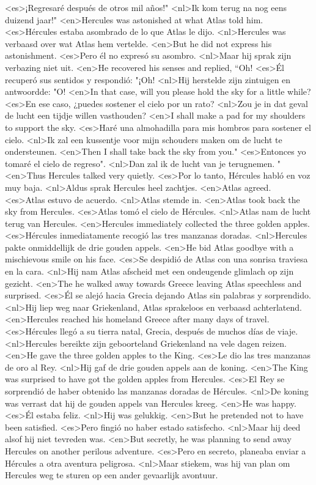 <es>¡Regresaré después de otros mil años!"
<nl>Ik kom terug na nog eens duizend jaar!"
<en>Hercules was astonished at what Atlas told him.
<es>Hércules estaba asombrado de lo que Atlas le dijo.
<nl>Hercules was verbaasd over wat Atlas hem vertelde.
<en>But he did not express his astonishment.
<es>Pero él no expresó su asombro.
<nl>Maar hij sprak zijn verbazing niet uit.
<en>He recovered his senses and replied, “Oh!
<es>Él recuperó sus sentidos y respondió: "¡Oh!
<nl>Hij herstelde zijn zintuigen en antwoordde: "O!
<en>In that case, will you please hold the sky for a little while?
<es>En ese caso, ¿puedes sostener el cielo por un rato?
<nl>Zou je in dat geval de lucht een tijdje willen vasthouden?
<en>I shall make a pad for my shoulders to support the sky.
<es>Haré una almohadilla para mis hombros para sostener el cielo.
<nl>Ik zal een kussentje voor mijn schouders maken om de lucht te ondersteunen.
<en>Then I shall take back the sky from you."
<es>Entonces yo tomaré el cielo de regreso".
<nl>Dan zal ik de lucht van je terugnemen. "
<en>Thus Hercules talked very quietly.
<es>Por lo tanto, Hércules habló en voz muy baja.
<nl>Aldus sprak Hercules heel zachtjes.
<en>Atlas agreed.
<es>Atlas estuvo de acuerdo.
<nl>Atlas stemde in.
<en>Atlas took back the sky from Hercules.
<es>Atlas tomó el cielo de Hércules.
<nl>Atlas nam de lucht terug van Hercules.
<en>Hercules immediately collected the three golden apples.
<es>Hércules inmediatamente recogió las tres manzanas doradas.
<nl>Hercules pakte onmiddellijk de drie gouden appels.
<en>He bid Atlas goodbye with a mischievous smile on his face.
<es>Se despidió de Atlas con una sonrisa traviesa en la cara.
<nl>Hij nam Atlas afscheid met een ondeugende glimlach op zijn gezicht.
<en>The he walked away towards Greece leaving Atlas speechless and surprised.
<es>Él se alejó hacia Grecia dejando Atlas sin palabras y sorprendido.
<nl>Hij liep weg naar Griekenland,  Atlas sprakeloos en verbaasd achterlatend.
<en>Hercules reached his homeland Greece after many days of travel.
<es>Hércules llegó a su tierra natal, Grecia, después de muchos días de viaje.
<nl>Hercules bereikte zijn geboorteland Griekenland na vele dagen reizen.
<en>He gave the three golden apples to the King.
<es>Le dio las tres manzanas de oro al Rey.
<nl>Hij gaf de drie gouden appels aan de koning.
<en>The King was surprised to have got the golden apples from Hercules.
<es>El Rey se sorprendió de haber obtenido las manzanas doradas de Hércules.
<nl>De koning was verrast dat hij de gouden appels van Hercules kreeg.
<en>He was happy.
<es>Él estaba feliz.
<nl>Hij was gelukkig.
<en>But he pretended not to have been satisfied.
<es>Pero fingió no haber estado satisfecho.
<nl>Maar hij deed alsof hij niet tevreden was.
<en>But secretly, he was planning to send away Hercules on another perilous adventure.
<es>Pero en secreto, planeaba enviar a Hércules a otra aventura peligrosa.
<nl>Maar stiekem,  was hij van plan om Hercules weg te sturen op een ander gevaarlijk avontuur.

